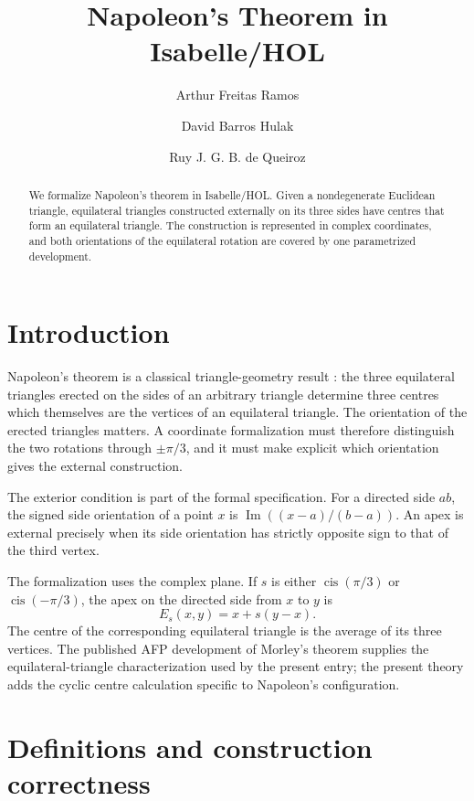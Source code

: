 \documentclass[11pt,a4paper]{article}
\begin{document}
\title{Napoleon's Theorem in Isabelle/HOL}
\author{Arthur Freitas Ramos \and David Barros Hulak \and Ruy J. G. B. de Queiroz}
\maketitle

\begin{abstract}
We formalize Napoleon's theorem in Isabelle/HOL.  Given a nondegenerate
Euclidean triangle, equilateral triangles constructed externally on its three
sides have centres that form an equilateral triangle.  The construction is
represented in complex coordinates, and both orientations of the equilateral
rotation are covered by one parametrized development.
\end{abstract}

\tableofcontents

\section{Introduction}

Napoleon's theorem is a classical triangle-geometry result
\cite{honsberger1995episodes}: the three
equilateral triangles erected on the sides of an arbitrary triangle determine
three centres which themselves are the vertices of an equilateral triangle.
The orientation of the erected triangles matters.  A coordinate
formalization must therefore distinguish the two rotations through
\(\pm\pi/3\), and it must make explicit which orientation gives the external
construction.

The exterior condition is part of the formal specification.  For a directed
side \(ab\), the signed side orientation of a point \(x\) is
\(\operatorname{Im}((x-a)/(b-a))\).  An apex is external precisely when its
side orientation has strictly opposite sign to that of the third vertex.

The formalization uses the complex plane.  If \(s\) is either
\(\operatorname{cis}(\pi/3)\) or \(\operatorname{cis}(-\pi/3)\), the apex on the
directed side from \(x\) to \(y\) is
\[
  E_s(x,y)=x+s(y-x).
\]
The centre of the corresponding equilateral triangle is the average of its
three vertices.  The published AFP development of Morley's theorem
\cite{morleyAFP} supplies
the equilateral-triangle characterization used by the present entry; the
present theory adds the cyclic centre calculation specific to Napoleon's
configuration.

\section{Definitions and construction correctness}
\end{document}
